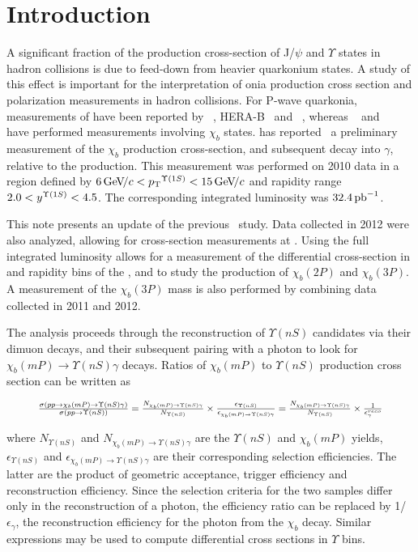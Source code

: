 \section{Introduction}
\label{sec:introduction}

A significant fraction of the production cross-section of J/$\psi$ and
$\Upsilon$ states in hadron collisions is due to feed-down from heavier
quarkonium states. A study of this effect is important for the interpretation of
onia production cross section and polarization measurements in hadron
collisions. For P-wave quarkonia, measurements of \chic have been reported by
\cdf~\cite{Abulencia:2007bra}, HERA-B~\cite{Abt:2008ed}
and \lhcb~\cite{LHCb-PAPER-2011-019}, whereas \cdf~\cite{Affolder:1999wm} and 
\atlas~\cite{Aad:2011ih} have performed measurements involving $\chi_b$ states.
\lhcb has reported~\cite{LHCb-PAPER-2012-015} a preliminary measurement of
the $\chi_b$ production cross-section, and subsequent decay into \OneS $\gamma$,
relative to the \OneS production. This measurement was performed on 2010 data
in a region defined by $6 \gevc < \pt^{\Y1S} < 15 \gevc$ and rapidity range
$2.0 < y^{\Y1S} < 4.5$.
The corresponding integrated luminosity was $32.4\mbox{\,pb}^{-1}$.

This note presents an update of the previous \lhcb\ study. Data collected in
2012 were also analyzed, allowing for cross-section measurements at \tev.
Using the full integrated luminosity allows for a measurement of the
differential cross-section in \pt and rapidity bins of the \OneS, and to study
the production of $\chi_b(2P)$ and $\chi_b(3P)$. A measurement of the
$\chi_b(3P)$ mass is also performed by combining data collected in 2011 and
2012.

The analysis proceeds through the reconstruction of $\Upsilon(nS)$ candidates
via their dimuon decays, and their subsequent pairing with a photon to look for
$\chi_b(mP) \to \Upsilon(nS) \gamma$ decays. Ratios of $\chi_b(mP)$ to
$\Upsilon(nS)$ production cross section can be written as

\begin{equation}
\resizebox{.9\hsize}{!}{
$
    \frac{\sigma(pp \to \chi_b(mP)
    	\to \Upsilon(nS) \gamma)}{\sigma(pp \to \Upsilon(nS))} =
    \frac{N_{\chi_b(mP)\to \Upsilon(nS) \gamma}}{N_{\Upsilon(nS)}} \times \frac{\epsilon_{\Upsilon(nS)}}{\epsilon_{\chi_b(mP)\to \Upsilon(nS) \gamma}} =
    \frac{N_{\chi_b(mP)\to \Upsilon(nS) \gamma}}{N_{\Upsilon(nS)}} \times \frac{1}{\epsilon^{reco}_{\gamma}}
$
}
\label{eqn:master}
\end{equation}


\noindent where
${N_{\Upsilon(nS)}}$ and ${N_{\chi_b(mP)\to \Upsilon(nS) \gamma}}$ are the
$\Upsilon(nS)$ and $\chi_b(mP)$ yields, $\epsilon_{\Upsilon(nS)}$ and
$\epsilon_{\chi_b(mP)\to \Upsilon(nS) \gamma}$ are their corresponding selection
efficiencies. The latter are the product of geometric acceptance, trigger
efficiency and reconstruction efficiency. Since the selection criteria for the
two samples differ only in the reconstruction of a photon, the efficiency ratio
can be replaced by 1/$\epsilon_{\gamma}$, the reconstruction efficiency for the
photon from the $\chi_b$ decay. Similar expressions may be used to compute
differential cross sections in $\Upsilon$ \pt bins.